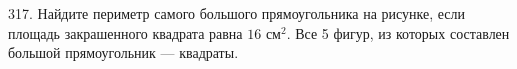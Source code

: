317. Найдите периметр самого большого прямоугольника на рисунке, если площадь закрашенного квадрата равна $16\text{ см}^2.$ Все 5 фигур, из которых составлен большой прямоугольник --- квадраты.\\
\begin{figure}[ht!]
\end{figure}\\
